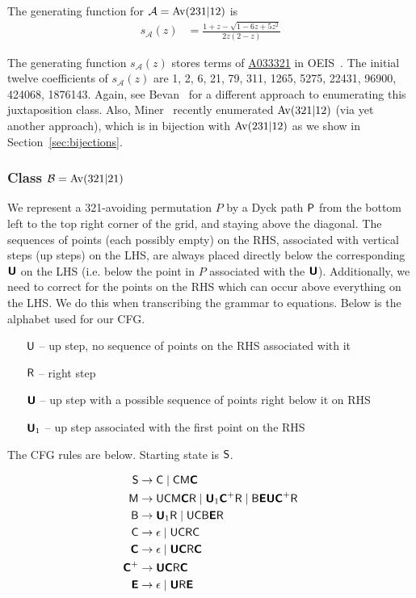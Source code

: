 \documentclass[12pt, a4paper, twoside]{report}
\begin{document}
\begin{theorem}
The generating function for $\mathcal{A} = \mathrm{Av}(231|12)$ is 
\begin{align*}
s_{\mathcal{A}}(z)
&= \frac{1+z-\sqrt{1-6z+5z^2}}{2z(2-z)}
\end{align*}
\end{theorem}

The generating function $s_{\mathcal{A}}(z)$ stores terms of \href{http://oeis.org/A033321}{A033321} in OEIS~\cite{oeis}. The initial twelve coefficients of $s_{\mathcal{A}}(z)$ are 1, 2, 6, 21, 79, 311, 1265, 5275, 22431, 96900, 424068, 1876143. Again, see Bevan~\cite{bevan-new} for a different approach to enumerating this juxtaposition class. Also, Miner~\cite{miner16twobyfour} recently enumerated $\mathrm{Av}(321|12)$ (via yet another approach), which is in bijection with $\mathrm{Av}(231|12)$ as we show in Section~\ref{sec:bijections}.


\subsubsection{Class $\mathcal{B} = \mathrm{Av}(321|21)$}
\label{sec:catalanjuxt_av321av21}
We represent a 321-avoiding permutation $P$ by a Dyck path $\textsf{P}$ from the bottom left to the top right corner of the grid, and staying above the diagonal. The sequences of points (each possibly empty) on the RHS, associated with vertical steps (up steps) on the LHS, are always placed directly below the corresponding $\textbf{\textsf{U}}$ on the LHS (i.e. below the point in $P$ associated with the $\textbf{\textsf{U}}$). Additionally, we need to correct for the points on the RHS which can occur above everything on the LHS. We do this when transcribing the grammar to equations. Below is the alphabet used for our CFG.

\begin{enumerate}
\item[$\mathsf{U}$ --] up step, no sequence of points on the RHS associated with it
\item[$\mathsf{R}$ --] right step
\item[$\textbf{\textsf{U}}$ --] up step with a possible sequence of points right below it on RHS
\item[$\textbf{\textsf{U}}_1$ --] up step associated with the first point on the RHS 
\end{enumerate}

\noindent The CFG rules are below. Starting state is $\mathsf{S}$.

\begin{align*}
\mathsf{S} &\to \mathsf{C} \mid \mathsf{C}\mathsf{M}\textbf{\textsf{C}}\\
\mathsf{M} &\to \mathsf{U}\mathsf{C}\mathsf{M}\textbf{\textsf{C}}\mathsf{R} \mid \textbf{\textsf{U}}_1\textbf{\textsf{C}}^+\mathsf{R} \mid \mathsf{B}\textbf{\textsf{E}}\textbf{\textsf{U}}\textbf{\textsf{C}}^+\mathsf{R}\\
\mathsf{B} &\to \textbf{\textsf{U}}_1\mathsf{R} \mid \mathsf{U}\mathsf{C}\mathsf{B}\textbf{\textsf{E}}\mathsf{R}\\
\mathsf{C} &\to \epsilon \mid \mathsf{U}\mathsf{C}\mathsf{R}\mathsf{C}\\
\textbf{\textsf{C}} &\to \epsilon \mid \textbf{\textsf{U}}\textbf{\textsf{C}}\mathsf{R}\textbf{\textsf{C}}\\
\textbf{\textsf{C}}^+ &\to \textbf{\textsf{U}}\textbf{\textsf{C}}\mathsf{R}\textbf{\textsf{C}}\\
\textbf{\textsf{E}} &\to \epsilon \mid \textbf{\textsf{U}}\mathsf{R}\textbf{\textsf{E}}
\end{align*}
\end{document}
